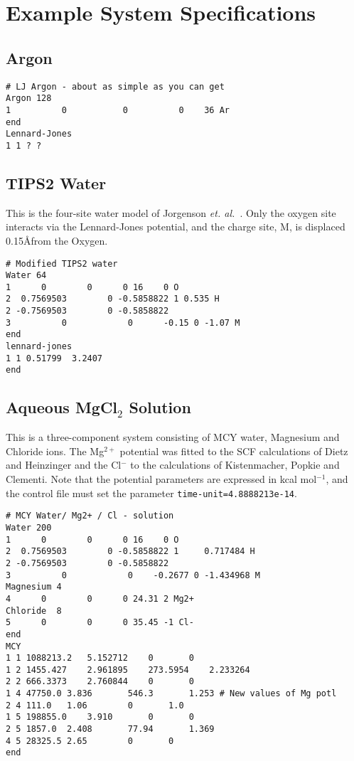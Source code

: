 \chapter{Example System Specifications}
\label{sec:examples}
\section{Argon}
\begin{verbatim}
# LJ Argon - about as simple as you can get
Argon 128
1          0           0          0    36 Ar
end
Lennard-Jones
1 1 ? ?
\end{verbatim}
\section{TIPS2 Water}
This is the four-site water model of Jorgenson {\em et. al.\
}\cite{jorgensen:??}.  Only the oxygen site interacts via the Lennard-Jones
potential, and the charge site, M, is displaced 0.15\AA from the Oxygen.
\begin{verbatim}
# Modified TIPS2 water
Water 64
1 	   0 		0 	   0 16    0 O
2  0.7569503		0 -0.5858822 1 0.535 H
2 -0.7569503		0 -0.5858822
3          0            0      -0.15 0 -1.07 M
end
lennard-jones
1 1 0.51799  3.2407
end
\end{verbatim}
\section{Aqueous MgCl$_2$ Solution}
This is a three-component system consisting of MCY water\cite{matsuoka:75},
Magnesium and Chloride ions.  The Mg$^{2+}$ potential was fitted to
the SCF calculations of Dietz and Heinzinger\cite{dietz:8?} and the Cl$^-$
to the calculations of Kistenmacher, Popkie and Clementi\cite{kistenmacher:7?}.
Note that the potential parameters are expressed in kcal mol$^{-1}$,
and the control file must set the parameter \verb'time-unit=4.8888213e-14'.
\begin{verbatim}
# MCY Water/ Mg2+ / Cl - solution
Water 200
1 	   0 		0 	   0 16    0 O
2  0.7569503		0 -0.5858822 1     0.717484 H
2 -0.7569503		0 -0.5858822
3          0            0    -0.2677 0 -1.434968 M
Magnesium 4
4	   0		0	   0 24.31 2 Mg2+
Chloride  8
5	   0		0	   0 35.45 -1 Cl-
end
MCY
1 1 1088213.2 	5.152712 	0 		0
1 2 1455.427 	2.961895 	273.5954 	2.233264
2 2 666.3373 	2.760844 	0 		0
1 4 47750.0	3.836		546.3		1.253 # New values of Mg potl
2 4 111.0	1.06		0		1.0   
1 5 198855.0	3.910		0		0
2 5 1857.0	2.408		77.94		1.369
4 5 28325.5	2.65		0		0
end
\end{verbatim}
